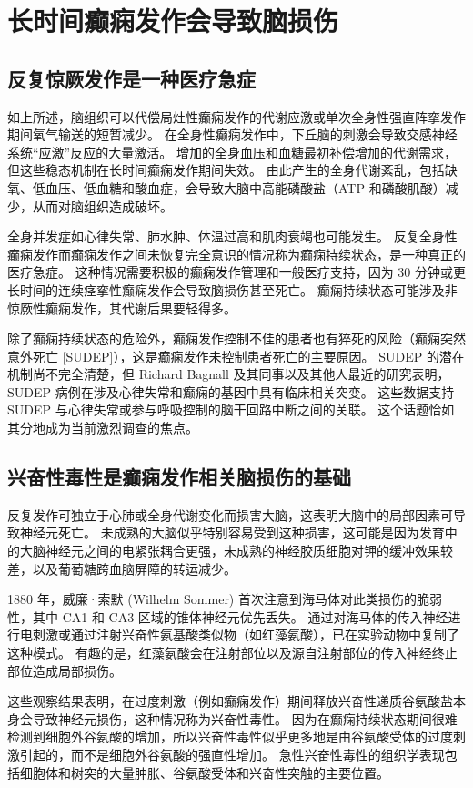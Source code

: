 \section{长时间癫痫发作会导致脑损伤}
\subsection{反复惊厥发作是一种医疗急症}
如上所述，脑组织可以代偿局灶性癫痫发作的代谢应激或单次全身性强直阵挛发作期间氧气输送的短暂减少。 在全身性癫痫发作中，下丘脑的刺激会导致交感神经系统“应激”反应的大量激活。 增加的全身血压和血糖最初补偿增加的代谢需求，但这些稳态机制在长时间癫痫发作期间失效。 由此产生的全身代谢紊乱，包括缺氧、低血压、低血糖和酸血症，会导致大脑中高能磷酸盐（ATP 和磷酸肌酸）减少，从而对脑组织造成破坏。

全身并发症如心律失常、肺水肿、体温过高和肌肉衰竭也可能发生。 反复全身性癫痫发作而癫痫发作之间未恢复完全意识的情况称为癫痫持续状态，是一种真正的医疗急症。 这种情况需要积极的癫痫发作管理和一般医疗支持，因为 30 分钟或更长时间的连续痉挛性癫痫发作会导致脑损伤甚至死亡。 癫痫持续状态可能涉及非惊厥性癫痫发作，其代谢后果要轻得多。

除了癫痫持续状态的危险外，癫痫发作控制不佳的患者也有猝死的风险（癫痫突然意外死亡 [SUDEP]），这是癫痫发作未控制患者死亡的主要原因。 SUDEP 的潜在机制尚不完全清楚，但 Richard Bagnall 及其同事以及其他人最近的研究表明，SUDEP 病例在涉及心律失常和癫痫的基因中具有临床相关突变。 这些数据支持 SUDEP 与心律失常或参与呼吸控制的脑干回路中断之间的关联。 这个话题恰如其分地成为当前激烈调查的焦点。

\subsection{兴奋性毒性是癫痫发作相关脑损伤的基础}
反复发作可独立于心肺或全身代谢变化而损害大脑，这表明大脑中的局部因素可导致神经元死亡。 未成熟的大脑似乎特别容易受到这种损害，这可能是因为发育中的大脑神经元之间的电紧张耦合更强，未成熟的神经胶质细胞对钾的缓冲效果较差，以及葡萄糖跨血脑屏障的转运减少。

1880 年，威廉·索默 (Wilhelm Sommer) 首次注意到海马体对此类损伤的脆弱性，其中 CA1 和 CA3 区域的锥体神经元优先丢失。 通过对海马体的传入神经进行电刺激或通过注射兴奋性氨基酸类似物（如红藻氨酸），已在实验动物中复制了这种模式。 有趣的是，红藻氨酸会在注射部位以及源自注射部位的传入神经终止部位造成局部损伤。

这些观察结果表明，在过度刺激（例如癫痫发作）期间释放兴奋性递质谷氨酸盐本身会导致神经元损伤，这种情况称为兴奋性毒性。 因为在癫痫持续状态期间很难检测到细胞外谷氨酸的增加，所以兴奋性毒性似乎更多地是由谷氨酸受体的过度刺激引起的，而不是细胞外谷氨酸的强直性增加。 急性兴奋性毒性的组织学表现包括细胞体和树突的大量肿胀、谷氨酸受体和兴奋性突触的主要位置。

